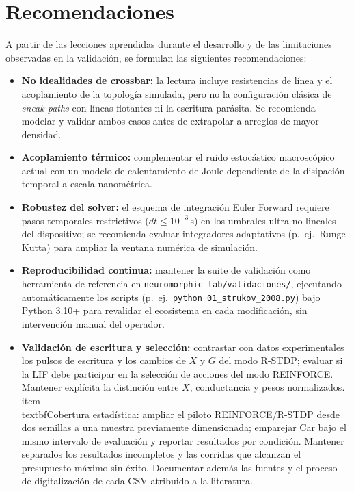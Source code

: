\section{Recomendaciones}

A partir de las lecciones aprendidas durante el desarrollo y de las limitaciones
observadas en la validación, se formulan las siguientes recomendaciones:

\begin{itemize}
    \item \textbf{No idealidades de crossbar:} la lectura incluye
    resistencias de línea y el acoplamiento de la topología simulada, pero no
    la configuración clásica de \textit{sneak paths} con líneas flotantes ni
    la escritura parásita. Se recomienda modelar y validar ambos casos antes
    de extrapolar a arreglos de mayor densidad.
    \item \textbf{Acoplamiento térmico:} complementar el ruido estocástico
    macroscópico actual con un modelo de calentamiento de Joule dependiente de
    la disipación temporal a escala nanométrica.
    \item \textbf{Robustez del solver:} el esquema de integración Euler
    Forward requiere pasos temporales restrictivos ($dt \leq 10^{-3}$\,s) en
    los umbrales ultra no lineales del dispositivo; se recomienda evaluar
    integradores adaptativos (p.\ ej.\ Runge-Kutta) para ampliar la ventana
    numérica de simulación.
    \item \textbf{Reproducibilidad continua:} mantener la suite de validación
    como herramienta de referencia en \texttt{neuromorphic\_lab/validaciones/},
    ejecutando automáticamente los scripts (p.\ ej.\
    \texttt{python 01\_strukov\_2008.py}) bajo Python 3.10+ para revalidar el
    ecosistema en cada modificación, sin intervención manual del operador.
    \item \textbf{Validación de escritura y selección:} contrastar con datos
    experimentales los pulsos de escritura y los cambios de $X$ y $G$ del
    modo R-STDP; evaluar si la LIF debe participar en la selección de
    acciones del modo REINFORCE. Mantener explícita la distinción entre
    $X$, conductancia y pesos normalizados.
    \\item \\textbf{Cobertura estad\'istica:} ampliar el piloto REINFORCE/R-STDP
    desde dos semillas a una muestra previamente dimensionada; emparejar Car
    bajo el mismo intervalo de evaluaci\'on y reportar resultados por condici\'on.
    Mantener separados los resultados incompletos y las corridas que alcanzan
    el presupuesto m\'aximo sin {\'e}xito. Documentar adem\'as las fuentes y el
    proceso de digitalizaci\'on de cada CSV atribuido a la literatura.
\end{itemize}

